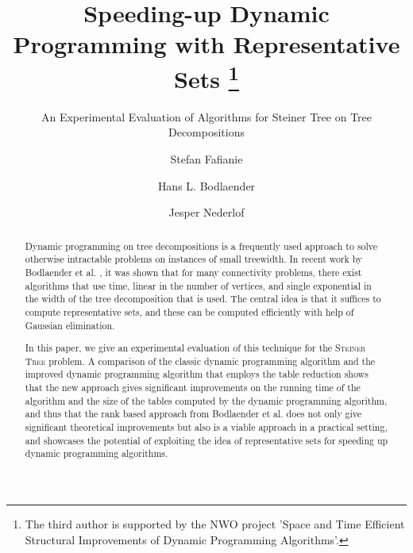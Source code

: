 \documentclass{llncs}
\begin{document}
\title{Speeding-up Dynamic Programming with Representative Sets \thanks{The third author is supported by the NWO project 'Space and Time Efficient Structural Improvements of Dynamic Programming Algorithms'.}}

\subtitle{An Experimental Evaluation of Algorithms for Steiner Tree on Tree Decompositions}


\author{Stefan Fafianie
\and Hans L. Bodlaender
\and Jesper Nederlof}


\maketitle

\begin{abstract}
Dynamic programming on tree decompositions is a frequently used approach to
solve otherwise intractable problems on instances of small treewidth. 
In recent work by Bodlaender et al. \cite{BodlaenderCKN12}, it was shown that for many connectivity problems,
there exist algorithms that use time, linear in the number of vertices, and 
single exponential in the width of the tree decomposition that is used.
The central idea is that it suffices to compute representative sets, and these
can be computed efficiently with
help of Gaussian elimination.

In this paper, we give an experimental evaluation of this technique for the 
\textsc{Steiner Tree} problem. A comparison of the classic dynamic programming
algorithm and the improved dynamic programming algorithm that employs the
table reduction shows that the new approach gives significant improvements
on the running time of the algorithm and the size of the tables computed by the dynamic programming
algorithm, and thus that the rank based approach from
Bodlaender et al. \cite{BodlaenderCKN12} does not only give significant theoretical improvements but
also is a viable approach in a practical setting, and showcases the potential of
exploiting the idea of representative sets for speeding up dynamic programming algorithms.

\end{abstract}
\end{document}
